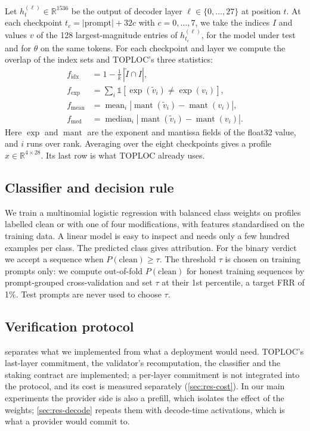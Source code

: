 \documentclass[11pt]{article}
\begin{document}
Let $h^{(\ell)}_t \in \mathbb{R}^{1536}$ be the output of decoder layer $\ell \in \{0,\dots,27\}$ at position $t$.
At each checkpoint $t_c = |\text{prompt}| + 32c$ with $c = 0,\dots,7$, we take the indices $I$ and values $v$ of the 128 largest-magnitude entries of $h^{(\ell)}_{t_c}$, for the model under test and for $\theta$ on the same tokens.
For each checkpoint and layer we compute the overlap of the index sets and TOPLOC's three statistics:
\begin{align*}
  f_{\text{idx}} &= 1 - \tfrac{1}{k}\,|\tilde I \cap I|, \\
  f_{\exp} &= \textstyle\sum_{i} \mathbb{1}[\operatorname{exp}(\tilde v_i) \neq \operatorname{exp}(v_i)], \\
  f_{\text{mean}} &= \operatorname{mean}_i |\operatorname{mant}(\tilde v_i) - \operatorname{mant}(v_i)|, \\
  f_{\text{med}} &= \operatorname{median}_i |\operatorname{mant}(\tilde v_i) - \operatorname{mant}(v_i)|.
\end{align*}
Here $\operatorname{exp}$ and $\operatorname{mant}$ are the exponent and mantissa fields of the float32 value, and $i$ runs over rank.
Averaging over the eight checkpoints gives a profile $x \in \mathbb{R}^{4 \times 28}$.
Its last row is what TOPLOC already uses.

\subsection{Classifier and decision rule}
\label{sec:classifier}

We train a multinomial logistic regression with balanced class weights on profiles labelled clean or with one of four modifications, with features standardised on the training data.
A linear model is easy to inspect and needs only a few hundred examples per class.
The predicted class gives attribution.
For the binary verdict we accept a sequence when $P(\text{clean}) \ge \tau$.
The threshold $\tau$ is chosen on training prompts only: we compute out-of-fold $P(\text{clean})$ for honest training sequences by prompt-grouped cross-validation and set $\tau$ at their 1st percentile, a target FRR of 1\%.
Test prompts are never used to choose $\tau$.

\subsection{Verification protocol}
\label{sec:protocol}

 separates what we implemented from what a deployment would need.
TOPLOC's last-layer commitment, the validator's recomputation, the classifier and the staking contract are implemented; a per-layer commitment is not integrated into the protocol, and its cost is measured separately (\cref{sec:res-cost}).
In our main experiments the provider side is also a prefill, which isolates the effect of the weights; \cref{sec:res-decode} repeats them with decode-time activations, which is what a provider would commit to.
\end{document}
